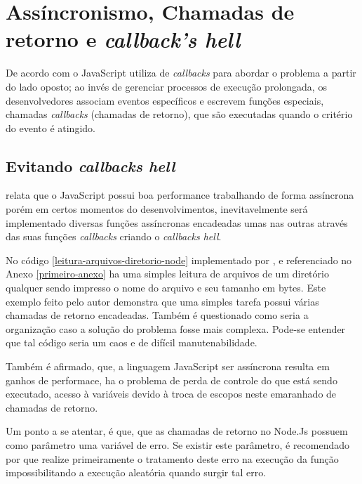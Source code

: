 \section{Assíncronismo, Chamadas de retorno e \textit{callback's hell}}
\label{chamadas-de-retorno-e-callback-hell}

  De acordo com  o JavaScript utiliza de \textit{callbacks}
  para abordar o problema a  partir do lado oposto; ao invés de gerenciar processos de execução prolongada, 
  os desenvolvedores associam eventos específicos e escrevem funções especiais, chamadas \textit{callbacks}
  (chamadas de retorno), que são executadas quando o critério do evento é atingido.

\subsection{Evitando \textit{callbacks hell}}

  \cite{Pereira:2013} relata que o JavaScript possui boa performance trabalhando de forma assíncrona porém em certos 
  momentos do desenvolvimentos, inevitavelmente será implementado diversas funções assíncronas encadeadas umas nas 
  outras através das suas funções \textit{callbacks} criando o \textit{callbacks hell}.
  
  No código \ref{leitura-arquivos-diretorio-node} implementado por , e referenciado no Anexo \ref{primeiro-anexo}
  ha uma simples leitura de arquivos de um diretório qualquer sendo impresso o nome do arquivo e seu tamanho em
  bytes. Este exemplo feito pelo autor demonstra que uma simples tarefa possui várias chamadas de retorno encadeadas. Também
  é questionado como seria a organização caso a solução do problema fosse mais complexa. Pode-se entender que tal código
  seria um caos e de difícil manutenabilidade.
  
  Também é afirmado, que, a linguagem JavaScript ser assíncrona resulta em ganhos de 
  performace, ha o problema de perda de controle do que está sendo executado, acesso à variáveis devido à troca de escopos
  neste emaranhado de chamadas de retorno.
  
  Um ponto a se atentar, é que, que as chamadas de retorno no Node.Js possuem como parâmetro uma variável de erro. Se existir
  este parâmetro, é recomendado por  que realize primeiramente o tratamento deste erro na execução da função
  impossibilitando a execução aleatória quando surgir tal erro.
  
